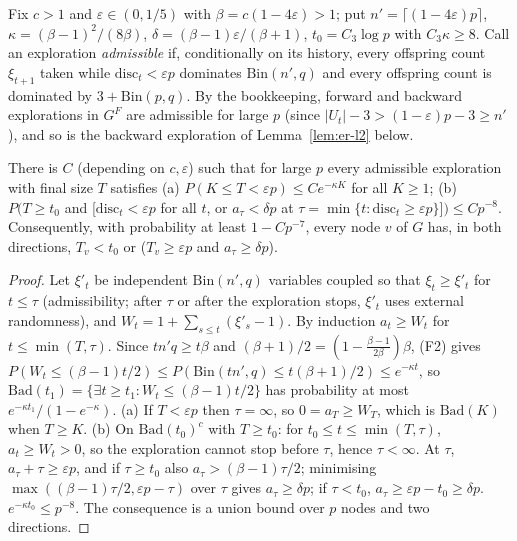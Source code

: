 Fix $c>1$ and $\varepsilon\in(0,1/5)$ with $\beta=c(1-4\varepsilon)>1$; put
$n'=\lceil(1-4\varepsilon)p\rceil$, $\kappa=(\beta-1)^2/(8\beta)$,
$\delta=(\beta-1)\varepsilon/(\beta+1)$, $t_0=C_3\log p$ with $C_3\kappa\ge8$.
Call an exploration \emph{admissible} if, conditionally on its history, every
offspring count $\xi_{t+1}$ taken while $\mathrm{disc}_t<\varepsilon p$
dominates $\mathrm{Bin}(n',q)$ and every offspring count is dominated by
$3+\mathrm{Bin}(p,q)$. By the bookkeeping, forward and backward explorations in
$G^F$ are admissible for large $p$ (since $|U_t|-3>(1-\varepsilon)p-3\ge n'$),
and so is the backward exploration of Lemma~\ref{lem:er-l2} below.

\begin{lemma}[dichotomy]\label{lem:er-l1}
There is $C$ (depending on $c,\varepsilon$) such that for large $p$ every
admissible exploration with final size $T$ satisfies
(a) $P(K\le T<\varepsilon p)\le Ce^{-\kappa K}$ for all $K\ge1$;
(b) $P\big(T\ge t_0$ and [$\mathrm{disc}_t<\varepsilon p$ for all $t$, or
$a_\tau<\delta p$ at $\tau=\min\{t:\mathrm{disc}_t\ge\varepsilon p\}$]$\big)\le Cp^{-8}$.
Consequently, with probability at least $1-Cp^{-7}$, every node $v$ of $G$ has, in
both directions, $T_v<t_0$ or ($T_v\ge\varepsilon p$ and $a_\tau\ge\delta p$).
\end{lemma}
\begin{proof}
Let $\xi'_t$ be independent $\mathrm{Bin}(n',q)$ variables coupled so that
$\xi_t\ge\xi'_t$ for $t\le\tau$ (admissibility; after $\tau$ or after the
exploration stops, $\xi'_t$ uses external randomness), and
$W_t=1+\sum_{s\le t}(\xi'_s-1)$. By induction $a_t\ge W_t$ for
$t\le\min(T,\tau)$. Since $tn'q\ge t\beta$ and
$(\beta+1)/2=(1-\frac{\beta-1}{2\beta})\beta$, (F2) gives
$P(W_t\le(\beta-1)t/2)\le P(\mathrm{Bin}(tn',q)\le t(\beta+1)/2)\le e^{-\kappa t}$,
so $\mathrm{Bad}(t_1)=\{\exists t\ge t_1:W_t\le(\beta-1)t/2\}$ has probability at
most $e^{-\kappa t_1}/(1-e^{-\kappa})$.
(a) If $T<\varepsilon p$ then $\tau=\infty$, so $0=a_T\ge W_T$, which is
$\mathrm{Bad}(K)$ when $T\ge K$.
(b) On $\mathrm{Bad}(t_0)^c$ with $T\ge t_0$: for $t_0\le t\le\min(T,\tau)$,
$a_t\ge W_t>0$, so the exploration cannot stop before $\tau$, hence
$\tau<\infty$. At $\tau$, $a_\tau+\tau\ge\varepsilon p$, and if $\tau\ge t_0$
also $a_\tau>(\beta-1)\tau/2$; minimising $\max((\beta-1)\tau/2,\varepsilon p-\tau)$
over $\tau$ gives $a_\tau\ge\delta p$; if $\tau<t_0$, $a_\tau\ge\varepsilon p-t_0\ge\delta p$.
$e^{-\kappa t_0}\le p^{-8}$. The consequence is a union bound over $p$ nodes and
two directions.
\end{proof}

